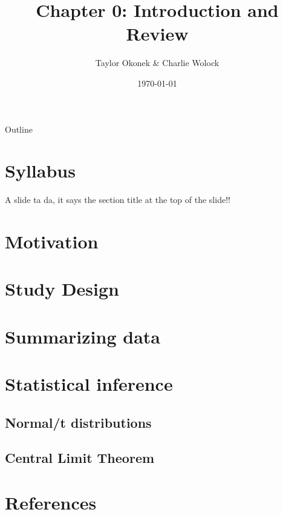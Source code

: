 \documentclass{beamer}
\title{Chapter 0: Introduction and Review}
\author{Taylor Okonek \& Charlie Wolock}
\date{\today}
\begin{document}
	\begin{frame}
	\titlepage 
\end{frame}
\begin{frame}{Outline}
\tableofcontents
\end{frame}


\section{Syllabus}

\begin{frame}{A slide}
ta da, it says the section title at the top of the slide!!
\end{frame}

\section{Motivation}

\section{Study Design}

\section{Summarizing data}

\section{Statistical inference}

\subsection{Normal/t distributions}

\subsection{Central Limit Theorem}

\section*{References}
\begin{frame}
\end{frame}
\end{document}
